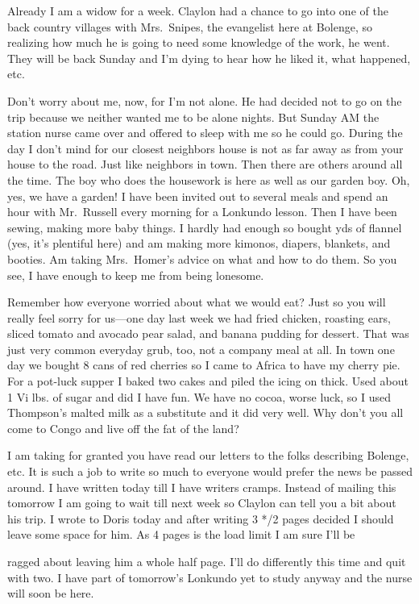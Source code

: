 \documentclass[
]{book}
\begin{document}
Already I am a widow for a week. Claylon had a chance to go into one of the back country villages with Mrs.~Snipes, the evangelist here at Bolenge, so realizing how much he is going to need some knowledge of the work, he went. They will be back Sunday and I'm dying to hear how he liked it, what happened, etc.

Don't worry about me, now, for I'm not alone. He had decided not to go on the trip because we neither wanted me to be alone nights. But Sunday AM the station nurse came over and offered to sleep with me so he could go. During the day I don't mind for our closest neighbors house is not as far away as from your house to the road. Just like neighbors in town. Then there are others around all the time. The boy who does the housework is here as well as our garden boy. Oh, yes, we have a garden! I have been invited out to several meals and spend an hour with Mr.~Russell every morning for a Lonkundo lesson. Then I have been sewing, making more baby things. I hardly had enough so bought yds of flannel (yes, it's plentiful here) and am making more kimonos, diapers, blankets, and booties. Am taking Mrs.~Homer's advice on what and how to do them. So you see, I have enough to keep me from being lonesome.

Remember how everyone worried about what we would eat? Just so you will really feel sorry for us---one day last week we had fried chicken, roasting ears, sliced tomato and avocado pear salad, and banana pudding for dessert. That was just very common everyday grub, too, not a company meal at all. In town one day we bought 8 cans of red cherries so I came to Africa to have my cherry pie. For a pot-luck supper I baked two cakes and piled the icing on thick. Used about 1 Vi lbs. of sugar and did I have fun. We have no cocoa, worse luck, so I used Thompson's malted milk as a substitute and it did very well. Why don't you all come to Congo and live off the fat of the land?

I am taking for granted you have read our letters to the folks describing Bolenge, etc. It is such a job to write so much to everyone would prefer the news be passed around. I have written today till I have writers cramps. Instead of mailing this tomorrow I am going to wait till next week so Claylon can tell you a bit about his trip. I wrote to Doris today and after writing 3 */2 pages decided I should leave some space for him. As 4 pages is the load limit I am sure I'll be

ragged about leaving him a whole half page. I'll do differently this time and quit with two. I have part of tomorrow's Lonkundo yet to study anyway and the nurse will soon be here.
\end{document}
